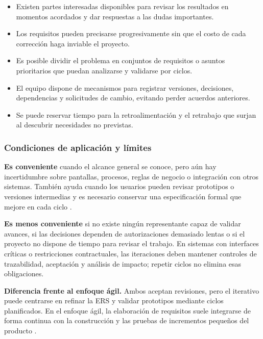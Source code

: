 \begin{itemize}
  \item Existen partes interesadas disponibles para revisar los resultados
  en momentos acordados y dar respuestas a las dudas importantes.
  \item Los requisitos pueden precisarse progresivamente sin que el costo de
  cada corrección haga inviable el proyecto.
  \item Es posible dividir el problema en conjuntos de requisitos o asuntos
  prioritarios que puedan analizarse y validarse por ciclos.
  \item El equipo dispone de mecanismos para registrar versiones, decisiones,
  dependencias y solicitudes de cambio, evitando perder acuerdos anteriores.
  \item Se puede reservar tiempo para la retroalimentación y el retrabajo
  que surjan al descubrir necesidades no previstas.
\end{itemize}

\subsubsection{Condiciones de aplicación y límites}

\textbf{Es conveniente} cuando el alcance general se conoce, pero aún hay
incertidumbre sobre pantallas, procesos, reglas de negocio o integración con
otros sistemas. También ayuda cuando los usuarios pueden revisar prototipos o
versiones intermedias y es necesario conservar una especificación formal que
mejore en cada ciclo \cite{sommerville2016}.

\textbf{Es menos conveniente} si no existe ningún representante capaz de
validar avances, si las decisiones dependen de autorizaciones demasiado
lentas o si el proyecto no dispone de tiempo para revisar el trabajo. En
sistemas con interfaces críticas o restricciones contractuales, las
iteraciones deben mantener controles de trazabilidad, aceptación y análisis
de impacto; repetir ciclos no elimina esas obligaciones.

\textbf{Diferencia frente al enfoque ágil.} Ambos aceptan revisiones, pero
el iterativo puede centrarse en refinar la ERS y validar prototipos mediante
ciclos planificados. En el enfoque ágil, la elaboración de requisitos suele
integrarse de forma continua con la construcción y las pruebas de incrementos
pequeños del producto \cite{schon2017}.
